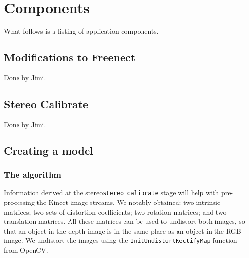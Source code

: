 

\section{Components}

What follows is a listing of application components.

\subsection{Modifications to Freenect}

Done by Jimi.

\subsection{Stereo Calibrate}

Done by Jimi.

\subsection{Creating a model}

\subsubsection{The algorithm}


Information derived at the stereo\texttt{stereo calibrate} stage will help with
pre-processing the Kinect image streams. We notably obtained: two intrinsic
matrices; two sets of distortion coefficients; two rotation matrices; and two
translation matrices. All these matrices can be used to undistort both images,
so that an object in the depth image is in the same place as an object in the
RGB image. We undistort the images using the \texttt{InitUndistortRectifyMap}
function from OpenCV.

